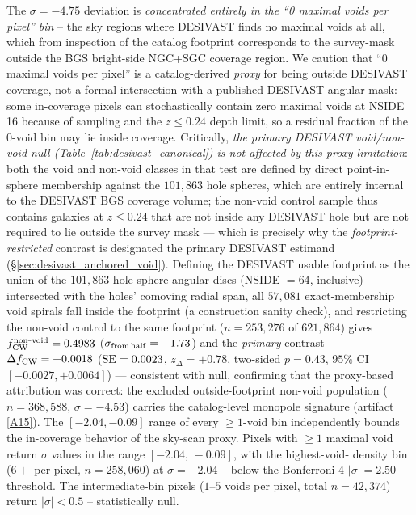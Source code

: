 \documentclass[aps,prd,twocolumn,superscriptaddress,showpacs,preprintnumbers,nofootinbib,longbibliography,floatfix]{revtex4-2}
\newcommand{\repoBase}{https://github.com/Hubify-Projects/bigbounce/blob/main}
\begin{document}
The $\sigma = -4.75$ deviation is \emph{concentrated entirely in the
``0 maximal voids per pixel'' bin} -- the sky regions where DESIVAST
finds no maximal voids at all, which from inspection of the catalog
footprint corresponds to the survey-mask outside the BGS bright-side
NGC+SGC coverage region. We caution that ``$0$ maximal voids per
pixel'' is a catalog-derived \emph{proxy} for being outside DESIVAST
coverage, not a formal intersection with a published DESIVAST angular
mask: some in-coverage pixels can stochastically contain zero maximal
voids at NSIDE\,16 because of sampling and the $z \leq 0.24$ depth
limit, so a residual fraction of the $0$-void bin may lie inside
coverage. Critically, \emph{the primary DESIVAST void/non-void null
(Table~\ref{tab:desivast_canonical}) is not affected by this proxy
limitation}: both the void and non-void classes in that test are
defined by direct point-in-sphere membership against the $101{,}863$
hole spheres, which are entirely internal to the DESIVAST BGS coverage
volume; the non-void control sample thus contains galaxies at
$z \leq 0.24$ that are not inside any DESIVAST hole but are not
required to lie outside the survey mask --- which is precisely why the
\emph{footprint-restricted} contrast is designated the primary DESIVAST
estimand (\S\ref{sec:desivast_anchored_void}). Defining the DESIVAST usable
footprint as the union of the $101{,}863$ hole-sphere angular discs
(NSIDE $= 64$, inclusive) intersected with the holes' comoving radial
span, all $57{,}081$ exact-membership void spirals fall inside the
footprint (a construction sanity check), and restricting the non-void
control to the same footprint ($n = 253{,}276$ of $621{,}864$) gives
$f_{\rm CW}^{\rm non\mbox{-}void} = 0.4983$ ($\sigma_{\rm from\,half} =
-1.73$) and the \emph{primary} contrast $\Delta f_{\rm CW} = +0.0018$
(${\rm SE} = 0.0023$, $z_\Delta = +0.78$, two-sided $p = 0.43$,
$95\%$ CI $[-0.0027, +0.0064]$) --- consistent with null, confirming that
the proxy-based attribution was correct: the excluded
outside-footprint non-void population ($n = 368{,}588$,
$\sigma = -4.53$) carries the catalog-level monopole signature
(artifact
\href{\repoBase/pipelines/p5\_desi\_chirality/outputs/29\_ext3\_desivast\_footprint\_retabulation.json}{[A15]}).
The $[-2.04, -0.09]$ range of every $\geq\!1$-void bin independently bounds
the in-coverage behavior of the sky-scan proxy. Pixels with $\geq 1$ maximal void return
$\sigma$ values in the range $[-2.04,\,-0.09]$, with the highest-void-
density bin ($6+$ per pixel, $n = 258{,}060$) at $\sigma = -2.04$ --
below the Bonferroni-4 $|\sigma| = 2.50$ threshold. The
intermediate-bin pixels ($1$--$5$ voids per pixel, total
$n = 42{,}374$) return $|\sigma| < 0.5$ -- statistically null.
\end{document}
